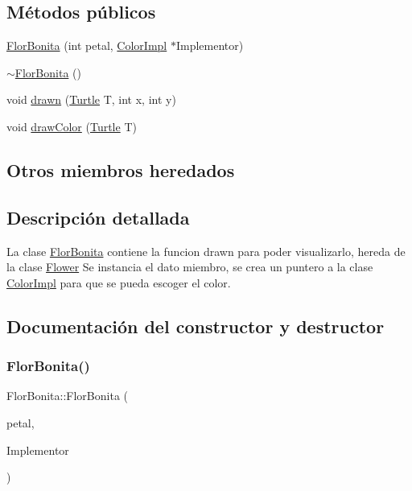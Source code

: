 \subsection*{Métodos públicos}
\begin{DoxyCompactItemize}
\item 
\hyperlink{classFlorBonita_a8cf57e9ccb82d679283c80b7286ed47e}{Flor\+Bonita} (int petal, \hyperlink{classColorImpl}{Color\+Impl} $\ast$Implementor)
\item 
\hyperlink{classFlorBonita_ada709e8050834cb8d988b5ba1bc558dc}{$\sim$\+Flor\+Bonita} ()
\item 
void \hyperlink{classFlorBonita_a028f32ccf00bb677f54349afa49657e4}{drawn} (\hyperlink{classTurtle}{Turtle} T, int x, int y)
\item 
void \hyperlink{classFlorBonita_a22345f27b2f33479d5d5b89cd7add93b}{draw\+Color} (\hyperlink{classTurtle}{Turtle} T)
\end{DoxyCompactItemize}
\subsection*{Otros miembros heredados}


\subsection{Descripción detallada}
La clase \hyperlink{classFlorBonita}{Flor\+Bonita} contiene la funcion drawn para poder visualizarlo, hereda de la clase \hyperlink{classFlower}{Flower}  Se instancia el dato miembro, se crea un puntero a la clase \hyperlink{classColorImpl}{Color\+Impl} para que se pueda escoger el color. 

\subsection{Documentación del constructor y destructor}
\mbox{\label{classFlorBonita_a8cf57e9ccb82d679283c80b7286ed47e}} 
\subsubsection{\texorpdfstring{Flor\+Bonita()}{FlorBonita()}}
{\footnotesize\ttfamily Flor\+Bonita\+::\+Flor\+Bonita (\begin{DoxyParamCaption}\item[{int}]{petal,  }\item[{\hyperlink{classColorImpl}{Color\+Impl} $\ast$}]{Implementor }\end{DoxyParamCaption})}

